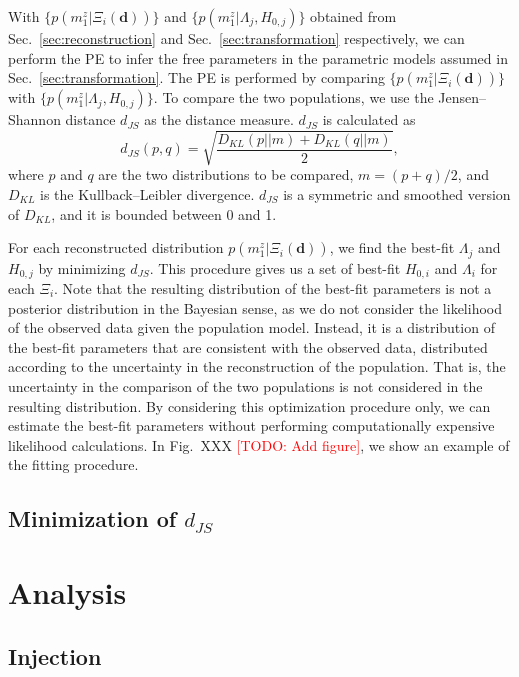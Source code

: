 \documentclass[aps,prd,twocolumn,superscriptaddress,preprintnumbers,nofootinbib,hidelinks]{revtex4-2}
\newcommand{\todo}[1]{\textcolor{red}{[TODO: #1]}}
\begin{document}
With $\{p(m^z_1|\Xi_i(\mathbf{d}))\}$ and $\{p(m^z_1|\Lambda_j, H_{0,j})\}$ obtained from Sec.~\ref{sec:reconstruction} and Sec.~\ref{sec:transformation} respectively, we can perform the \ac{PE} to infer the free parameters in the parametric models assumed in Sec.~\ref{sec:transformation}.
The \ac{PE} is performed by comparing $\{p(m^z_1|\Xi_i(\mathbf{d}))\}$ with $\{p(m^z_1|\Lambda_j, H_{0,j})\}$.
To compare the two populations, we use the Jensen–Shannon distance $d_{JS}$ as the distance measure.
$d_{JS}$ is calculated as
\begin{equation}
    d_{JS}(p, q) = \sqrt{\frac{D_{KL}(p||m) + D_{KL}(q||m)}{2}},
\end{equation}
where $p$ and $q$ are the two distributions to be compared, $m = (p + q) / 2$, and $D_{KL}$ is the Kullback–Leibler divergence.
$d_{JS}$ is a symmetric and smoothed version of $D_{KL}$, and it is bounded between 0 and 1.

For each reconstructed distribution $p(m^z_1|\Xi_i(\mathbf{d}))$, we find the best-fit $\Lambda_j$ and $H_{0,j}$ by minimizing $d_{JS}$.
This procedure gives us a set of best-fit $H_{0,i}$ and $\Lambda_i$ for each $\Xi_i$.
Note that the resulting distribution of the best-fit parameters is not a posterior distribution in the Bayesian sense, as we do not consider the likelihood of the observed data given the population model.
Instead, it is a distribution of the best-fit parameters that are consistent with the observed data, distributed according to the uncertainty in the reconstruction of the population.
That is, the uncertainty in the comparison of the two populations is not considered in the resulting distribution.
By considering this optimization procedure only, we can estimate the best-fit parameters without performing computationally expensive likelihood calculations.
In Fig.~XXX \todo{Add figure}, we show an example of the fitting procedure.

\subsection{Minimization of $d_{JS}$}
\label{sec:minimization}

\section{Analysis}
\label{sec:analysis}

\subsection{Injection}
\label{sec:injection-setup}
\end{document}
